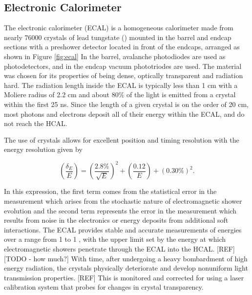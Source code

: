  \subsection{Electronic Calorimeter}

The electronic calorimeter (ECAL) is a homogeneous
 calorimeter made from nearly 76000 crystals of lead tungstate (\pbw)
 mounted in the barrel and endcap sections with a 
 preshower detector located in front of the endcaps,
 arranged as shown in Figure \ref{fig:ecal}
In the barrel, avalanche photodiodes are used as photodetectors, 
 and in the endcap vacuum phototriodes are used. 
The material \pbw was chosen for its properties of being
 dense, optically transparent and radiation hard. 
The radiation length inside the ECAL is typically less than 1 cm
 with a Moliere radius of 2.2 cm and about 80\% of the
 light is emitted from a crystal within the first 25 ns.
Since the length of a given crystal is on the order of 20 cm,
 most photons and electrons deposit all of their energy 
 within the ECAL, and do not reach the HCAL.

The use of \pbw crystals allows for excellent position and timing resolution
 with the energy resolution given by 

\begin{equation}\label{eq:ecal_res}
 \left(\frac{\delta_E}{E}\right) =  \left(\frac{2.8\%}{\sqrt{E}}\right)^2 + \left(\frac{0.12}{E}\right) + (0.30\%)^2 .
\end{equation}
 
In this expression, the first term comes from the statistical error 
 in the measurement which arises
 from the stochastic nature of electromagnetic shower evolution
 and the second term represents the error in the measurement
 which results from noise in the electronics or
 energy deposits from additional soft interactions.
The ECAL provides stable and accurate
 measurements of energies over a range from 1 \GeV to 1 \TeV, 
 with the upper limit set by the energy at which electromagnetic showers
 penetrate through the ECAL into the HCAL.
[REF][TODO - how much?]
With time, after undergoing a heavy bombardment of high energy radiation,
 the \pbw crystals physically deteriorate and develop 
 nonuniform light transmission properties.
[REF] 
This is monitored and corrected for using a laser calibration system
 that probes for changes in crystal transparency.


